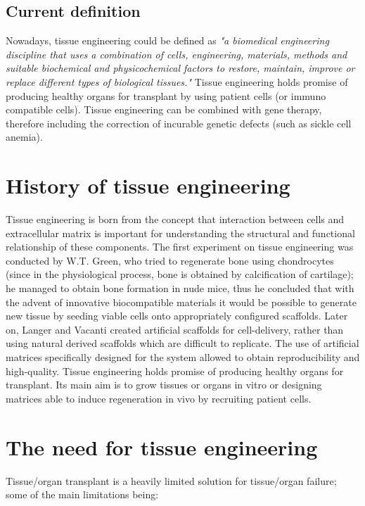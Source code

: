   \subsection{Current definition}
  Nowadays, tissue engineering could be defined as \textit{"a biomedical engineering discipline that uses a combination of cells, engineering, materials, methods and suitable biochemical and physicochemical factors to restore, maintain, improve or replace different types of biological tissues."}
  Tissue engineering holds promise of producing healthy organs for transplant by using patient cells (or immuno compatible cells). Tissue engineering can be combined with gene therapy, therefore including the correction of incurable genetic defects (such as sickle cell anemia).


\section{History of tissue engineering}
Tissue engineering is born from the concept that interaction between cells and extracellular matrix is important for understanding the structural and functional relationship of these components.
The first experiment on tissue engineering was conducted by W.T. Green, who tried to regenerate bone using chondrocytes (since in the physiological process, bone is obtained by calcification of cartilage); he managed to obtain bone formation in nude mice, thus he concluded that with the advent of innovative biocompatible materials it would be possible to generate new tissue by seeding viable cells onto appropriately configured scaffolds.
Later on, Langer and Vacanti created artificial scaffolds for cell-delivery, rather than using natural derived scaffolds which are difficult to replicate. The use of artificial matrices specifically designed for the system allowed to obtain reproducibility and high-quality.
Tissue engineering holds promise of producing healthy organs for transplant.
Its main aim is to grow tissues or organs in vitro or designing matrices able to induce regeneration in vivo by recruiting patient cells.

\section{The need for tissue engineering}
Tissue/organ transplant is a heavily limited solution for tissue/organ failure; some of the main limitations being:

